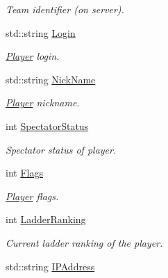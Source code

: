 \begin{DoxyCompactItemize}
\begin{DoxyCompactList}\small\item\em Team identifier (on server). \end{DoxyCompactList}\item 
\hypertarget{structPlayer_a38398818d43e186aa982a788744792d7}{std\-::string \hyperlink{structPlayer_a38398818d43e186aa982a788744792d7}{Login}}\label{structPlayer_a38398818d43e186aa982a788744792d7}

\begin{DoxyCompactList}\small\item\em \hyperlink{structPlayer}{Player} login. \end{DoxyCompactList}\item 
\hypertarget{structPlayer_a553cc1b0aa79108b511ba408210582cf}{std\-::string \hyperlink{structPlayer_a553cc1b0aa79108b511ba408210582cf}{Nick\-Name}}\label{structPlayer_a553cc1b0aa79108b511ba408210582cf}

\begin{DoxyCompactList}\small\item\em \hyperlink{structPlayer}{Player} nickname. \end{DoxyCompactList}\item 
\hypertarget{structPlayer_a2037601661fb699454a88b5649485b30}{int \hyperlink{structPlayer_a2037601661fb699454a88b5649485b30}{Spectator\-Status}}\label{structPlayer_a2037601661fb699454a88b5649485b30}

\begin{DoxyCompactList}\small\item\em Spectator status of player. \end{DoxyCompactList}\item 
\hypertarget{structPlayer_aa151b994eedc8ba67b3fd48905db5ac0}{int \hyperlink{structPlayer_aa151b994eedc8ba67b3fd48905db5ac0}{Flags}}\label{structPlayer_aa151b994eedc8ba67b3fd48905db5ac0}

\begin{DoxyCompactList}\small\item\em \hyperlink{structPlayer}{Player} flags. \end{DoxyCompactList}\item 
\hypertarget{structPlayer_a25fe69852f0e38f541ad615cd59877ef}{int \hyperlink{structPlayer_a25fe69852f0e38f541ad615cd59877ef}{Ladder\-Ranking}}\label{structPlayer_a25fe69852f0e38f541ad615cd59877ef}

\begin{DoxyCompactList}\small\item\em Current ladder ranking of the player. \end{DoxyCompactList}\item 
\hypertarget{structPlayer_a388787a2218deeaf7318f0fbbd3f5d0f}{std\-::string \hyperlink{structPlayer_a388787a2218deeaf7318f0fbbd3f5d0f}{I\-P\-Address}}\label{structPlayer_a388787a2218deeaf7318f0fbbd3f5d0f}


\end{DoxyCompactItemize}
